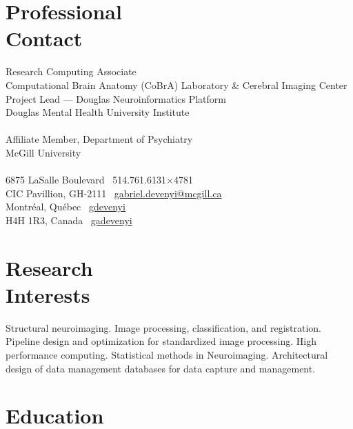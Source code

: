 \documentclass[margin1,line,canadian]{resume}
\begin{document}
\begin{resume}
 \section{\mysidestyle{}Professional\\Contact}
 Research Computing Associate\\
 Computational Brain Anatomy (CoBrA) Laboratory \& Cerebral Imaging Center\\
 Project Lead --- Douglas Neuroinformatics Platform\\
 Douglas Mental Health University Institute\\
 \\
 Affiliate Member, Department of Psychiatry\\
 McGill University\\
 \\
 6875 LaSalle Boulevard \hfill \faPhone~514.761.6131$\times$4781\\
 CIC Pavillion, GH-2111 \hfill \faEnvelope~\href{mailto:gabriel.devenyi@mcgill.ca}{gabriel.devenyi@mcgill.ca}\\
 Montr\'{e}al, Qu\'{e}bec \hfill \faGithub~\href{https://github.com/gdevenyi}{gdevenyi}\\
 H4H 1R3, Canada \hfill \faTwitter~\href{https://twitter.com/gadevenyi}{gadevenyi}\\
 \vspace{-4.5mm}%

 \section{\mysidestyle{}Research\\Interests}

 Structural neuroimaging. Image processing, classification, and registration. Pipeline design and optimization
 for standardized image processing. High performance computing. Statistical methods in Neuroimaging.
 Architectural design of data management databases for data capture and management.

 \section{\mysidestyle{}Education}


\end{resume}
\end{document}

